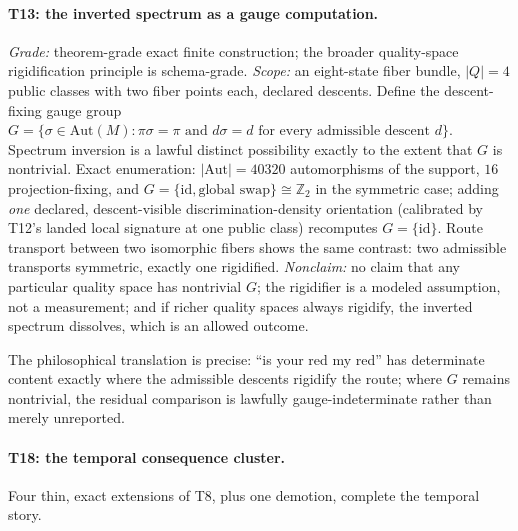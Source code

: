 \paragraph{T13: the inverted spectrum as a gauge computation.}
\begin{theorem}
\gradeS{} \emph{Grade:} theorem-grade exact finite construction; the broader
quality-space rigidification principle is schema-grade. \emph{Scope:} an
eight-state fiber bundle, $|Q| = 4$ public classes with two fiber points
each, declared descents. Define the descent-fixing gauge group
$G = \{\sigma \in \mathrm{Aut}(M) : \pi\sigma = \pi \text{ and } d\sigma = d
\text{ for every admissible descent } d\}$. Spectrum inversion is a lawful
distinct possibility exactly to the extent that $G$ is nontrivial. Exact
enumeration: $|\mathrm{Aut}|=40320$ automorphisms of the support, $16$
projection-fixing, and $G = \{\mathrm{id}, \text{global swap}\} \cong
\mathbb{Z}_2$ in the symmetric case; adding \emph{one} declared,
descent-visible discrimination-density orientation (calibrated by T12's
landed local signature at one public class) recomputes $G = \{\mathrm{id}\}$.
Route transport between two isomorphic fibers shows the same contrast: two
admissible transports symmetric, exactly one rigidified. \emph{Nonclaim:} no
claim that any particular quality space has nontrivial $G$; the rigidifier is
a modeled assumption, not a measurement; and if richer quality spaces always
rigidify, the inverted spectrum dissolves, which is an allowed outcome.
\end{theorem}

The philosophical translation is precise: ``is your red my red'' has
determinate content exactly where the admissible descents rigidify the route;
where $G$ remains nontrivial, the residual comparison is lawfully
gauge-indeterminate rather than merely unreported.

\paragraph{T18: the temporal consequence cluster.}
Four thin, exact extensions of T8, plus one demotion, complete the temporal
story.

